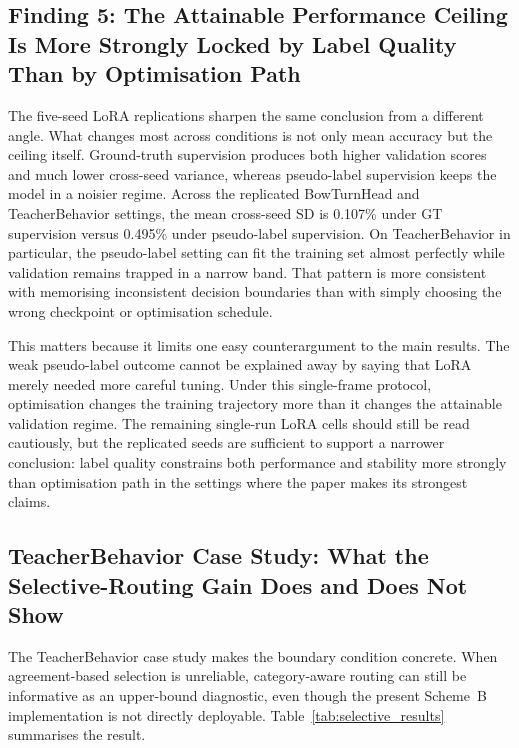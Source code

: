 \documentclass{ieeeaccess}
\begin{document}
\subsection{Finding 5: The Attainable Performance Ceiling Is More
Strongly Locked by Label Quality Than by Optimisation Path}

The five-seed LoRA replications sharpen the same conclusion from a
different angle.
What changes most across conditions is not only mean accuracy but the
ceiling itself.
Ground-truth supervision produces both higher validation scores and
much lower cross-seed variance, whereas pseudo-label supervision keeps
the model in a noisier regime.
Across the replicated BowTurnHead and TeacherBehavior settings, the
mean cross-seed SD is 0.107\% under GT supervision versus 0.495\%
under pseudo-label supervision.
On TeacherBehavior in particular, the pseudo-label setting can fit the
training set almost perfectly while validation remains trapped in a
narrow band.
That pattern is more consistent with memorising inconsistent decision
boundaries than with simply choosing the wrong checkpoint or
optimisation schedule.

This matters because it limits one easy counterargument to the main
results.
The weak pseudo-label outcome cannot be explained away by saying that
LoRA merely needed more careful tuning.
Under this single-frame protocol, optimisation changes the
training trajectory more than it changes the attainable validation
regime.
The remaining single-run LoRA cells should still be read cautiously,
but the replicated seeds are sufficient to support a narrower
conclusion: label quality constrains both performance and stability
more strongly than optimisation path in the settings where the paper
makes its strongest claims.

\subsection{TeacherBehavior Case Study: What the Selective-Routing
Gain Does and Does Not Show}

The TeacherBehavior case study makes the boundary condition concrete.
When agreement-based selection is unreliable, category-aware routing
can still be informative as an upper-bound diagnostic, even though the
present Scheme~B implementation is not directly deployable.
Table~\ref{tab:selective_results} summarises the result.
\end{document}
